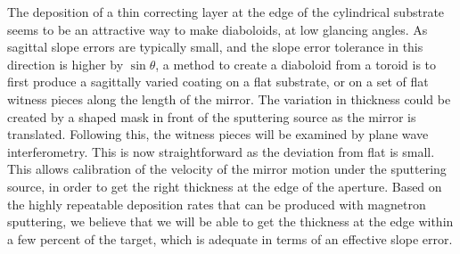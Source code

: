 \documentclass[preprint]{iucr}       %
\begin{document}
The deposition of a thin correcting layer at the edge of the cylindrical substrate seems to be an attractive way to make diaboloids, at low glancing angles. %
As sagittal slope errors are typically small, and the slope error tolerance in this direction is higher by $\sin\theta$, a method to create a diaboloid from a toroid is to first produce a sagittally varied coating on a flat substrate, or on a set of flat witness pieces along the length of the mirror. The variation in thickness could be created by a shaped mask in front of the sputtering source as the mirror is translated. Following this, the witness pieces will be examined by plane wave interferometry. This is now straightforward as the deviation from flat is small.
This allows calibration of the velocity of the mirror motion under the sputtering source, in order to get the right thickness at the edge of the aperture. Based on the highly repeatable deposition rates that can be produced with magnetron sputtering, we believe that we will be able to get the thickness at the edge within a few percent of the target, which is adequate in terms of an effective slope error. 
\end{document}
